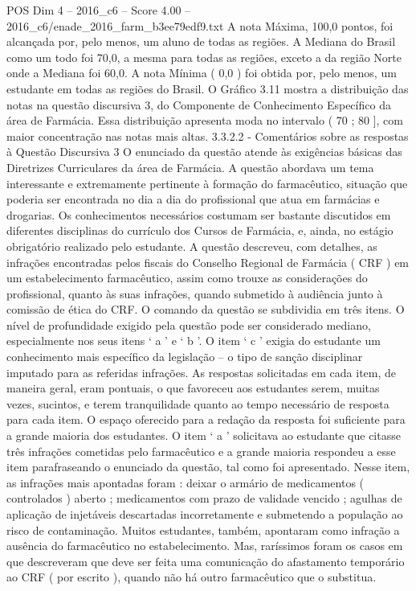 \begin{textsample}{POS Dim 4 – 2016\_c6 – Score 4.00 – 2016\_c6/enade\_2016\_farm\_b3ee79edf9.txt}
A nota Máxima, 100,0 pontos, foi alcançada por, pelo menos, um aluno de todas as regiões.
A Mediana do Brasil como um todo foi 70,0, a mesma para todas as regiões, exceto a da região Norte onde a Mediana foi 60,0.
A nota Mínima ( 0,0 ) foi obtida por, pelo menos, um estudante em todas as regiões do Brasil.
O Gráfico 3.11 mostra a distribuição das notas na questão discursiva 3, do Componente de Conhecimento Específico da área de Farmácia.
Essa distribuição apresenta moda no intervalo ( 70 ; 80 ], com maior concentração nas notas mais altas. 3.3.2.2 - Comentários sobre as respostas à Questão Discursiva 3 O enunciado da questão atende às exigências básicas das Diretrizes Curriculares da área de Farmácia.
A questão abordava um tema interessante e extremamente pertinente à formação do farmacêutico, situação que poderia ser encontrada no dia a dia do profissional que atua em farmácias e drogarias.
Os conhecimentos necessários costumam ser bastante discutidos em diferentes disciplinas do currículo dos Cursos de Farmácia, e, ainda, no estágio obrigatório realizado pelo estudante.
A questão descreveu, com detalhes, as infrações encontradas pelos fiscais do Conselho Regional de Farmácia ( CRF ) em um estabelecimento farmacêutico, assim como trouxe as considerações do profissional, quanto às suas infrações, quando submetido à audiência junto à comissão de ética do CRF.
O comando da questão se subdividia em três itens.
O nível de profundidade exigido pela questão pode ser considerado mediano, especialmente nos seus itens ‘ a ’ e ‘ b ’.
O item ‘ c ’ exigia do estudante um conhecimento mais específico da legislação – o tipo de sanção disciplinar imputado para as referidas infrações.
As respostas solicitadas em cada item, de maneira geral, eram pontuais, o que favoreceu aos estudantes serem, muitas vezes, sucintos, e terem tranquilidade quanto ao tempo necessário de resposta para cada item.
O espaço oferecido para a redação da resposta foi suficiente para a grande maioria dos estudantes.
O item ‘ a ’ solicitava ao estudante que citasse três infrações cometidas pelo farmacêutico e a grande maioria respondeu a esse item parafraseando o enunciado da questão, tal como foi apresentado.
Nesse item, as infrações mais apontadas foram : deixar o armário de medicamentos ( controlados ) aberto ; medicamentos com prazo de validade vencido ; agulhas de aplicação de injetáveis descartadas incorretamente e submetendo a população ao risco de contaminação.
Muitos estudantes, também, apontaram como infração a ausência do farmacêutico no estabelecimento.
Mas, raríssimos foram os casos em que descreveram que deve ser feita uma comunicação do afastamento temporário ao CRF ( por escrito ), quando não há outro farmacêutico que o substitua.

\end{textsample}
